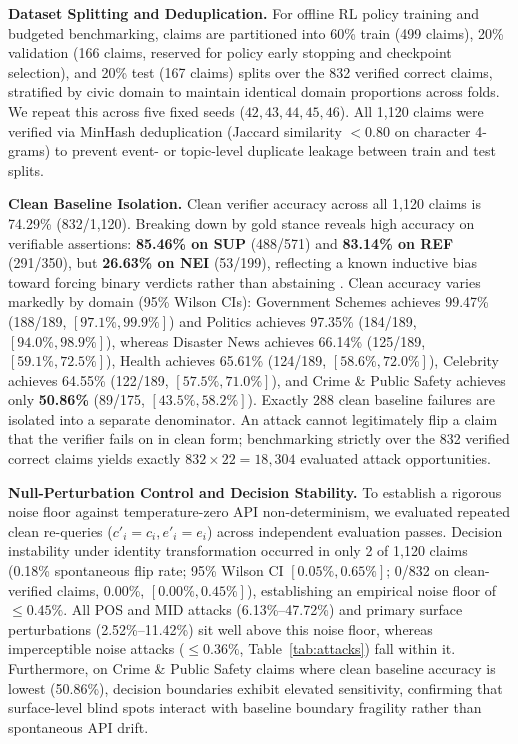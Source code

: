 \documentclass[11pt]{article}
\begin{document}
\textbf{Dataset Splitting and Deduplication.} For offline RL policy training and budgeted benchmarking, claims are partitioned into 60\% train (499 claims), 20\% validation (166 claims, reserved for policy early stopping and checkpoint selection), and 20\% test (167 claims) splits over the 832 verified correct claims, stratified by civic domain to maintain identical domain proportions across folds. We repeat this across five fixed seeds ($42, 43, 44, 45, 46$). All 1,120 claims were verified via MinHash deduplication (Jaccard similarity $< 0.80$ on character 4-grams) to prevent event- or topic-level duplicate leakage between train and test splits.

\textbf{Clean Baseline Isolation.} Clean verifier accuracy across all 1,120 claims is 74.29\% (832/1,120). Breaking down by gold stance reveals high accuracy on verifiable assertions: \textbf{85.46\% on SUP} (488/571) and \textbf{83.14\% on REF} (291/350), but \textbf{26.63\% on NEI} (53/199), reflecting a known inductive bias toward forcing binary verdicts rather than abstaining \citep{atanasova2022fact}. Clean accuracy varies markedly by domain (95\% Wilson CIs): Government Schemes achieves 99.47\% (188/189, $[97.1\%, 99.9\%]$) and Politics achieves 97.35\% (184/189, $[94.0\%, 98.9\%]$), whereas Disaster News achieves 66.14\% (125/189, $[59.1\%, 72.5\%]$), Health achieves 65.61\% (124/189, $[58.6\%, 72.0\%]$), Celebrity achieves 64.55\% (122/189, $[57.5\%, 71.0\%]$), and Crime \& Public Safety achieves only \textbf{50.86\%} (89/175, $[43.5\%, 58.2\%]$). Exactly 288 clean baseline failures are isolated into a separate denominator. An attack cannot legitimately flip a claim that the verifier fails on in clean form; benchmarking strictly over the 832 verified correct claims yields exactly $832 \times 22 = 18,304$ evaluated attack opportunities.

\textbf{Null-Perturbation Control and Decision Stability.} To establish a rigorous noise floor against temperature-zero API non-determinism, we evaluated repeated clean re-queries ($c'_i = c_i, e'_i = e_i$) across independent evaluation passes. Decision instability under identity transformation occurred in only 2 of 1,120 claims (0.18\% spontaneous flip rate; 95\% Wilson CI $[0.05\%, 0.65\%]$; 0/832 on clean-verified claims, 0.00\%, $[0.00\%, 0.45\%]$), establishing an empirical noise floor of $\le 0.45\%$. All POS and MID attacks (6.13\%--47.72\%) and primary surface perturbations (2.52\%--11.42\%) sit well above this noise floor, whereas imperceptible noise attacks ($\le 0.36\%$, Table~\ref{tab:attacks}) fall within it. Furthermore, on Crime \& Public Safety claims where clean baseline accuracy is lowest (50.86\%), decision boundaries exhibit elevated sensitivity, confirming that surface-level blind spots interact with baseline boundary fragility rather than spontaneous API drift.
\end{document}
